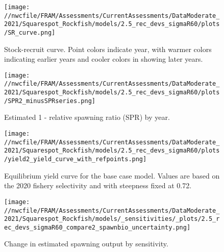 \documentclass[11pt,
  english,
  a4paper,
]{article}
\begin{document}
\tagmcend\tagstructend


\begin{figure}
\centering
\texttt{[image: //nwcfile/FRAM/Assessments/CurrentAssessments/DataModerate\_2021/Squarespot\_Rockfish/models/2.5\_rec\_devs\_sigmaR60/plots/SR\_curve.png]}
\caption{Stock-recruit curve. Point colors indicate year, with warmer colors indicating earlier years and cooler colors in showing later years.\label{fig:bh-curve}}
\end{figure}

\tagmcend\tagstructend


\begin{figure}
\centering
\texttt{[image: //nwcfile/FRAM/Assessments/CurrentAssessments/DataModerate\_2021/Squarespot\_Rockfish/models/2.5\_rec\_devs\_sigmaR60/plots/SPR2\_minusSPRseries.png]}
\caption{Estimated 1 - relative spawning ratio (SPR) by year.\label{fig:1-spr}}
\end{figure}

\tagmcend\tagstructend


\begin{figure}
\centering
\texttt{[image: //nwcfile/FRAM/Assessments/CurrentAssessments/DataModerate\_2021/Squarespot\_Rockfish/models/2.5\_rec\_devs\_sigmaR60/plots/yield2\_yield\_curve\_with\_refpoints.png]}
\caption{Equilibrium yield curve for the base case model. Values are based on the 2020 fishery selectivity and with steepness fixed at 0.72.\label{fig:yield}}
\end{figure}

\tagmcend\tagstructend


\begin{figure}
\centering
\texttt{[image: //nwcfile/FRAM/Assessments/CurrentAssessments/DataModerate\_2021/Squarespot\_Rockfish/models/\_sensitivities/\_plots/2.5\_rec\_devs\_sigmaR60\_compare2\_spawnbio\_uncertainty.png]}
\caption{Change in estimated spawning output by sensitivity.\label{fig:sens-ssb}}
\end{figure}
\end{document}
